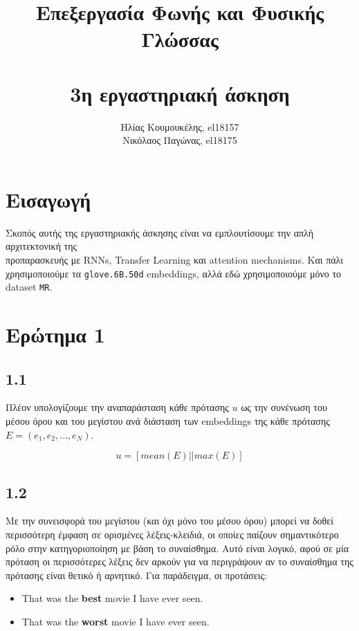 \documentclass[a4paper, 12pt]{article}
\title{
	\textbf{Επεξεργασία Φωνής και Φυσικής Γλώσσας} \\~\\
	3η εργαστηριακή άσκηση
}
\author{
	Ηλίας Κουμουκέλης, el18157 \\
	Νικόλαος Παγώνας, el18175
}
\date{}
\begin{document}
\maketitle

\section*{Εισαγωγή}
    
    Σκοπός αυτής της εργαστηριακής άσκησης είναι να εμπλουτίσουμε την απλή αρχιτεκτονική της \\ προπαρασκευής με RNNs, Transfer Learning και attention mechanisms. Και πάλι χρησιμοποιούμε τα \verb|glove.6B.50d| embeddings, αλλά εδώ χρησιμοποιούμε μόνο το dataset \verb|MR|.

\section*{Ερώτημα 1}

    \subsection*{1.1}
    
        Πλέον υπολογίζουμε την αναπαράσταση κάθε πρότασης $u$ ως την συνένωση του μέσου όρου και του μεγίστου ανά διάσταση των embeddings της κάθε πρότασης $E=(e_1, e_2, \dots, e_N)$.
        
        \[
            u = \left[ mean(E) || max(E) \right]
        \]
        
    \subsection*{1.2}
    
        Με την συνεισφορά του μεγίστου (και όχι μόνο του μέσου όρου) μπορεί να δοθεί περισσότερη έμφαση σε ορισμένες λέξεις-κλειδιά, οι οποίες παίζουν σημαντικότερο ρόλο στην κατηγοριοποίηση με βάση το συναίσθημα. Αυτό είναι λογικό, αφού σε μία πρόταση οι περισσότερες λέξεις δεν αρκούν για να περιγράψουν αν το συναίσθημα της πρότασης είναι θετικό ή αρνητικό. Για παράδειγμα, οι προτάσεις:
        
        \begin{itemize}
            \item That was the \textbf{best} movie I have ever seen.
            \item That was the \textbf{worst} movie I have ever seen.
        \end{itemize}
        
\end{document}
